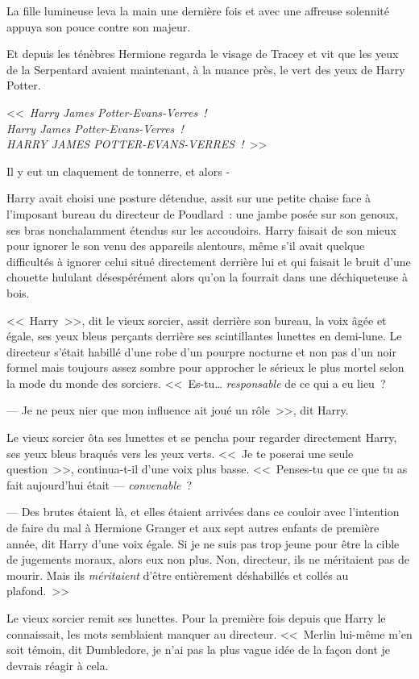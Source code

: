 La fille lumineuse leva la main une dernière fois et avec une affreuse solennité appuya son pouce contre son majeur.

Et depuis les ténèbres Hermione regarda le visage de Tracey et vit que les yeux de la Serpentard avaient maintenant, à la nuance près, le vert des yeux de Harry Potter.

<<~\emph{Harry James Potter-Evans-Verres~!\\
Harry James Potter-Evans-Verres~!\\
HARRY JAMES POTTER-EVANS-VERRES~!}~>>

Il y eut un claquement de tonnerre, et alors -

\later

Harry avait choisi une posture détendue, assit sur une petite chaise face à l'imposant bureau du directeur de Poudlard~: une jambe posée sur son genoux, ses bras nonchalamment étendus sur les accoudoirs. Harry faisait de son mieux pour ignorer le son venu des appareils alentours, même s'il avait quelque difficultés à ignorer celui situé directement derrière lui et qui faisait le bruit d'une chouette hululant désespérément alors qu'on la fourrait dans une déchiqueteuse à bois.

<<~Harry~>>, dit le vieux sorcier, assit derrière son bureau, la voix âgée et égale, ses yeux bleus perçants derrière ses scintillantes lunettes en demi-lune. Le directeur s'était habillé d'une robe d'un pourpre nocturne et non pas d'un noir formel mais toujours assez sombre pour approcher le sérieux le plus mortel selon la mode du monde des sorciers. <<~Es-tu… \emph{responsable} de ce qui a eu lieu~?

--- Je ne peux nier que mon influence ait joué un rôle~>>, dit Harry.

Le vieux sorcier ôta ses lunettes et se pencha pour regarder directement Harry, ses yeux bleus braqués vers les yeux verts. <<~Je te poserai une seule question~>>, continua-t-il d'une voix plus basse. <<~Penses-tu que ce que tu as fait aujourd'hui était — \emph{convenable}~?

--- Des brutes étaient là, et elles étaient arrivées dans ce couloir avec l'intention de faire du mal à Hermione Granger et aux sept autres enfants de première année, dit Harry d'une voix égale. Si je ne suis pas trop jeune pour être la cible de jugements moraux, alors eux non plus. Non, directeur, ils ne méritaient pas de mourir. Mais ils \emph{méritaient} d'être entièrement déshabillés et collés au plafond.~>>

Le vieux sorcier remit ses lunettes. Pour la première fois depuis que Harry le connaissait, les mots semblaient manquer au directeur. <<~Merlin lui-même m'en soit témoin, dit Dumbledore, je n'ai pas la plus vague idée de la façon dont je devrais réagir à cela.

